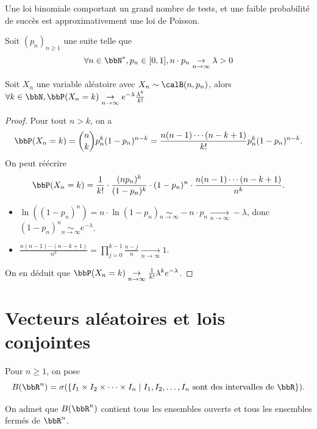 \begin{rqq}
    Une loi binomiale comportant un grand nombre de tests,
    et une faible probabilité de succès est approximativement une loi de Poisson.
\end{rqq}

\begin{thm}
    Soit $(p_n)_{n \geqslant 1}$ une suite telle que
    \[ \forall n \in \bbN^*, p_n \in [0, 1], n \cdot p_n \underset{n \to \infty}{\to} \lambda > 0 \]

    Soit $X_n$ une variable aléatoire avec $X_n \sim \calB(n, p_n)$,
    alors $\forall k \in \bbN, \bbP(X_n = k) \underset{n \to \infty}{\to} e^{-\lambda} \frac{\lambda^k}{k!}$
\end{thm}

\begin{proof}
    Pour tout $n > k$, on a
    \[ \bbP(X_n = k) = \binom{n}{k} p_n^k(1 - p_n)^{n - k}
        = \frac{n(n - 1) \cdots (n - k + 1)}{k!} p_n^k(1 - p_n)^{n - k}. \]
    On peut réécrire
    \[ \bbP(X_n = k) = \frac{1}{k!} \cdot \frac{(np_n)^k}{(1 - p_n)^{k}} \cdot (1 - p_n)^n \cdot \frac{n(n - 1) \cdots (n - k + 1)}{n^k}. \]

    \begin{itemize}
        \item $\ln\left((1 - p_n)^n\right) = n \cdot \ln(1 - p_n) \underset{n \to \infty}{\sim} -n \cdot p_n
                  \underset{n \to \infty}{\to} -\lambda$, donc $(1 - p_n)^n \underset{n \to \infty}{\sim} e^{-\lambda}$.
        \item $\frac{n(n - 1) \cdots (n - k + 1)}{n^k} = \prod_{j = 0}^{k - 1} \frac{n - j}{n} \underset{n \to \infty}{\to} 1$.
    \end{itemize}

    On en déduit que $\bbP(X_n = k) \underset{n \to \infty}{\to} \frac{1}{k!} \lambda^k e^{-\lambda}$.
\end{proof}

\section{Vecteurs aléatoires et lois conjointes}

\begin{deff}
    Pour $n \geqslant 1$, on pose
    \[ B(\bbR^n) = \sigma(\{ I_1 \times I_2 \times \cdots \times I_n \mid
        I_1, I_2, \ldots, I_n \text{ sont des intervalles de } \bbR \}). \]

    On admet que $B(\bbR^n)$ contient tous les ensembles ouverts et tous les ensembles fermés de $\bbR^n$.
\end{deff}

